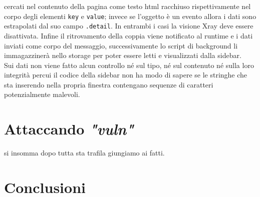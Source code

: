 \documentclass{sapthesis}
\newcommand{\code}[1]{\texttt{#1}}
\newcommand{\attr}[1]{\code{.#1}}
\newcommand{\vuln}{\textit{"vuln"}}
\begin{document}
        cercati nel contenuto della pagina come testo html racchiuso rispettivamente nel corpo
        degli elementi \code{key} e \code{value}; invece se l'oggetto è un evento allora i
        dati sono estrapolati dal suo campo \attr{detail}. In entrambi i casi la visione Xray
        deve essere disattivata.
        Infine il ritrovamento della coppia viene notificato al runtime e i dati inviati come
        corpo del messaggio, successivamente lo script di background li immagazzinerà nello
        storage per poter essere letti e visualizzati dalla sidebar.\\
        Sui dati non viene fatto alcun controllo né sul tipo, né sul contenuto né sulla loro
        integrità percui il codice della sidebar non ha modo di sapere se le stringhe che sta
        inserendo nella propria finestra contengano sequenze di caratteri potenzialmente malevoli.


\chapter{Attaccando \vuln}
\label{cap:attaccando-vuln}
    si insomma dopo tutta sta trafila giungiamo ai fatti.


\chapter{Conclusioni}


\printbibliography
\end{document}
